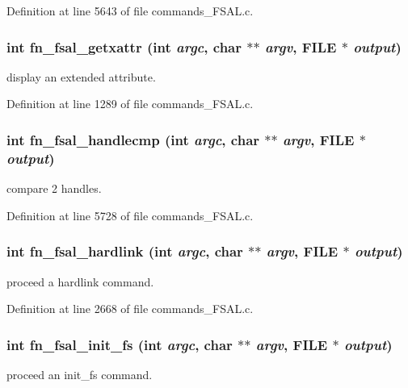 Definition at line 5643 of file commands\_\-FSAL.c.
\subsubsection[{fn\_\-fsal\_\-getxattr}]{\setlength{\rightskip}{0pt plus 5cm}int fn\_\-fsal\_\-getxattr (int {\em argc}, \/  char $\ast$$\ast$ {\em argv}, \/  FILE $\ast$ {\em output})}\label{commands__FSAL_8c_a1bc9d8bedd2c8b5adb767b449879ee18}
display an extended attribute. 

Definition at line 1289 of file commands\_\-FSAL.c.
\subsubsection[{fn\_\-fsal\_\-handlecmp}]{\setlength{\rightskip}{0pt plus 5cm}int fn\_\-fsal\_\-handlecmp (int {\em argc}, \/  char $\ast$$\ast$ {\em argv}, \/  FILE $\ast$ {\em output})}\label{commands__FSAL_8c_ac09a903f6e71134eb73920e6bc873b63}
compare 2 handles. 

Definition at line 5728 of file commands\_\-FSAL.c.
\subsubsection[{fn\_\-fsal\_\-hardlink}]{\setlength{\rightskip}{0pt plus 5cm}int fn\_\-fsal\_\-hardlink (int {\em argc}, \/  char $\ast$$\ast$ {\em argv}, \/  FILE $\ast$ {\em output})}\label{commands__FSAL_8c_ac9df7662f276abcf5428e6ff5f44593c}
proceed a hardlink command. 

Definition at line 2668 of file commands\_\-FSAL.c.
\subsubsection[{fn\_\-fsal\_\-init\_\-fs}]{\setlength{\rightskip}{0pt plus 5cm}int fn\_\-fsal\_\-init\_\-fs (int {\em argc}, \/  char $\ast$$\ast$ {\em argv}, \/  FILE $\ast$ {\em output})}\label{commands__FSAL_8c_a1c17fec3f6f369ed33c6e6881c7600e1}
proceed an init\_\-fs command. 


